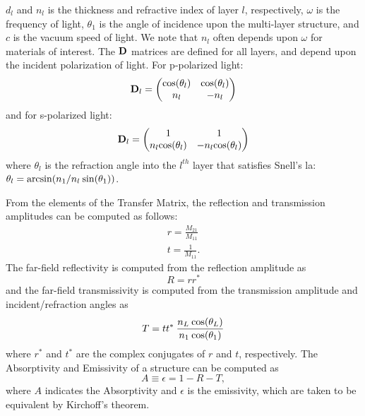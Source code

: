 \documentclass[journal=jpclcd,manuscript=suppinfo]{achemso}
\begin{document}
$d_l$ and $n_l$ is the thickness and refractive index of layer $l$, respectively, 
$\omega$ is the frequency of light, $\theta_1$ is the angle of incidence upon the 
multi-layer structure, and $c$ is the vacuum speed of light.  We note that 
$n_l$ often depends upon $\omega$ for materials of interest.  
The ${\bf D}$ matrices are defined for all layers, and depend upon the incident
polarization of light.  For p-polarized light:
\begin{equation}
{\bf D}_l = 
\begin{pmatrix}
    {\rm cos}(\theta_l)    &     {\rm cos}(\theta_l)   \\
    n_l    &     -n_l   
\end{pmatrix}
\end{equation}
and for s-polarized light:
\begin{equation}
{\bf D}_l = 
\begin{pmatrix}
    1 &     1   \\
    n_l {\rm cos}(\theta_l)    &     -n_l {\rm cos}(\theta_l)    
\end{pmatrix}
\end{equation}
where $\theta_l$ is the refraction angle into the $l^{th}$ layer that satisfies Snell's 
la: $\theta_l = {\rm arcsin}(n_1/n_l \: {\rm sin}(\theta_1))$.

From the elements of the Transfer Matrix, the reflection and transmission amplitudes
can be computed as follows:
\begin{align}
r = \frac{M_{21}}{M_{11}} \\
t = \frac{1}{M_{11}}.
\end{align}
The far-field reflectivity is computed from the reflection amplitude as
\begin{equation}
R = r r^*
\end{equation}
and the far-field transmissivity is computed from the transmission amplitude and 
incident/refraction angles as 
\begin{equation}
T = t t^* \: \frac{n_L \: {\rm cos}(\theta_L)}{n_1 \: {\rm cos}(\theta_1)}
\end{equation}
where $r^*$ and $t^*$ are the complex conjugates of $r$ and $t$, respectively.
The Absorptivity and Emissivity of a structure can be computed as
\begin{equation}
A \equiv \epsilon = 1 - R - T,
\end{equation}
where $A$ indicates the Absorptivity and $\epsilon$ is the emissivity, which are taken
to be equivalent by Kirchoff's theorem.
\end{document}

